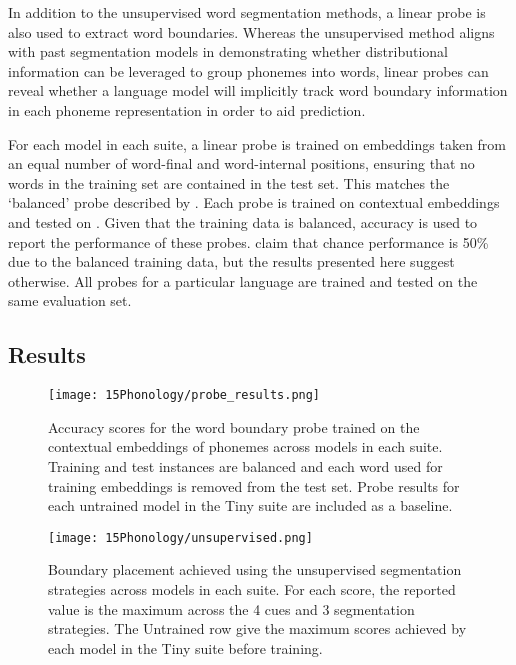 In addition to the unsupervised word segmentation methods, a linear probe is also used to extract word boundaries. Whereas the unsupervised method aligns with past segmentation models in demonstrating whether distributional information can be leveraged to group phonemes into words, linear probes can reveal whether a language model will implicitly track word boundary information in each phoneme representation in order to aid prediction. 

For each model in each suite, a linear probe is trained on embeddings taken from an equal number of word-final and word-internal positions, ensuring that no words in the training set are contained in the test set. This matches the `balanced' probe described by \citet{hahn-baroni-2019-tabula}. Each probe is trained on  contextual embeddings and tested on . Given that the training data is balanced, accuracy is used to report the performance of these probes. \citet{hahn-baroni-2019-tabula} claim that chance performance is 50\% due to the balanced training data, but the results presented here suggest otherwise. All probes for a particular language are trained and tested on the same evaluation set. 

\subsection{Results}

\begin{figure}[t]
    \centering
    \texttt{[image: 15Phonology/probe\_results.png]}
    \caption{Accuracy scores for the word boundary probe trained on the contextual embeddings of phonemes across models in each suite. Training and test instances are balanced and each word used for training embeddings is removed from the test set. Probe results for each untrained model in the Tiny suite are included as a baseline.}
    \label{fig:15-probes}
\end{figure}

\begin{figure}[t]
    \centering
    \texttt{[image: 15Phonology/unsupervised.png]}
    \caption{Boundary placement \fscores achieved using the unsupervised segmentation strategies across models in each suite. For each score, the reported value is the maximum across the 4 cues and 3 segmentation strategies. The Untrained row give the maximum scores achieved by each model in the Tiny suite before training.}
    \label{fig:15-unsupervised}
\end{figure}

